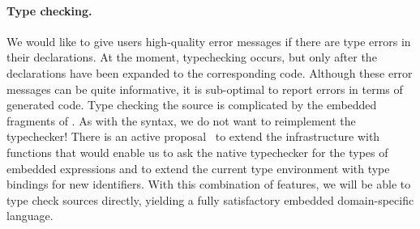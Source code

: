\paragraph{Type checking.}
We would like to give users high-quality error messages if there
are type errors in their \forest{} declarations.  At the moment, 
typechecking occurs, but only after the \forest{} declarations have
been expanded to the corresponding \haskell{} code.  Although these
error messages can be quite informative, it is sub-optimal to report
errors in terms of generated code.  Type checking the \forest{} source
is complicated by the embedded fragments of \haskell{}.  As with the
syntax, we do not want to reimplement the \haskell{} typechecker!  
There is an active proposal~\cite{extend-templates} to extend the \template{} infrastructure
with functions that would enable us to ask the native \haskell{}
typechecker for the types of embedded expressions and to extend the
current type environment with type bindings for new identifiers.  With
this combination of features, we will be able to type check \forest{}
sources directly, yielding a fully satisfactory embedded
domain-specific language.

